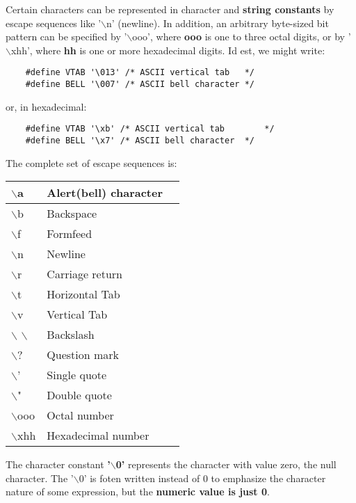 \documentclass{article}
\begin{document}
Certain characters can be represented in character and \textbf{string constants} by escape sequences like '$\backslash$n' (newline). In addition, an arbitrary byte-sized bit pattern can be specified by '$\backslash$ooo', where \textbf{ooo} is one to three octal digits, or by '$\backslash$xhh', where \textbf{hh} is one or more hexadecimal digits. Id est, we might write:

\begin{lstlisting}
	#define VTAB '\013' /* ASCII vertical tab 	*/
	#define BELL '\007' /* ASCII bell character	*/
\end{lstlisting}

or, in hexadecimal:

\begin{lstlisting}
	#define VTAB '\xb' /* ASCII vertical tab 		*/
	#define BELL '\x7' /* ASCII bell character	*/
\end{lstlisting}

The complete set of escape sequences is:

\begin{tabularx}{0.8\textwidth}{ 
  | >{\raggedright\arraybackslash}X 
  | >{\centering\arraybackslash}X 
  | >{\raggedleft\arraybackslash}X | }
  \hline
  $\backslash$a & Alert(bell) character \\
  \hline
  $\backslash$b & Backspace \\
  \hline
  $\backslash$f & Formfeed \\
  \hline
  $\backslash$n & Newline \\
  \hline
  $\backslash$r & Carriage return \\
  \hline
  $\backslash$t & Horizontal Tab\\
  \hline
  $\backslash$v & Vertical Tab \\
  \hline
  $\backslash$ $\backslash$ & Backslash \\
  \hline
  $\backslash$? & Question mark \\
  \hline
  $\backslash$' & Single quote \\
  \hline
  $\backslash$" & Double quote \\
  \hline
  $\backslash$ooo & Octal number \\
  \hline
  $\backslash$xhh & Hexadecimal number \\
  \hline
  
 \end{tabularx}

\vspace{8pt}
The character constant \textbf{'$\backslash$0'} represents the character with value zero, the null character. The '$\backslash$0' is foten written instead of 0 to emphasize the character nature of some expression, but the \textbf{numeric value is just 0}.
\end{document}
